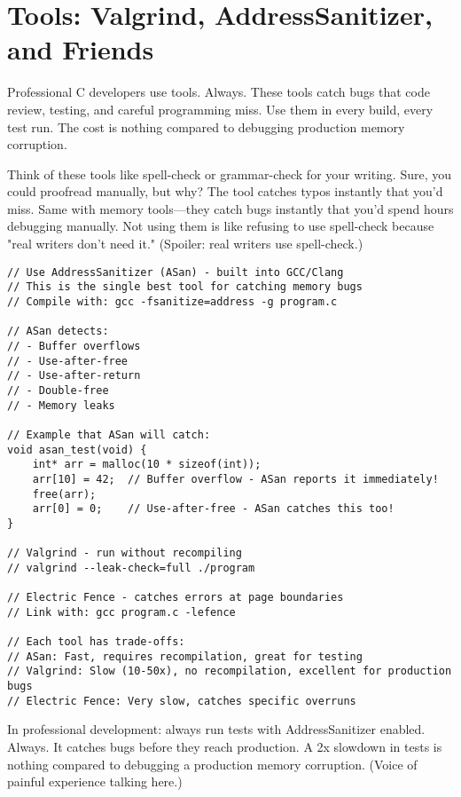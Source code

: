 \section{Tools: Valgrind, AddressSanitizer, and Friends}

Professional C developers use tools. Always. These tools catch bugs that code review, testing, and careful programming miss. Use them in every build, every test run. The cost is nothing compared to debugging production memory corruption.

Think of these tools like spell-check or grammar-check for your writing. Sure, you could proofread manually, but why? The tool catches typos instantly that you'd miss. Same with memory tools---they catch bugs instantly that you'd spend hours debugging manually. Not using them is like refusing to use spell-check because "real writers don't need it." (Spoiler: real writers use spell-check.)

\begin{lstlisting}
// Use AddressSanitizer (ASan) - built into GCC/Clang
// This is the single best tool for catching memory bugs
// Compile with: gcc -fsanitize=address -g program.c

// ASan detects:
// - Buffer overflows
// - Use-after-free
// - Use-after-return
// - Double-free
// - Memory leaks

// Example that ASan will catch:
void asan_test(void) {
    int* arr = malloc(10 * sizeof(int));
    arr[10] = 42;  // Buffer overflow - ASan reports it immediately!
    free(arr);
    arr[0] = 0;    // Use-after-free - ASan catches this too!
}

// Valgrind - run without recompiling
// valgrind --leak-check=full ./program

// Electric Fence - catches errors at page boundaries
// Link with: gcc program.c -lefence

// Each tool has trade-offs:
// ASan: Fast, requires recompilation, great for testing
// Valgrind: Slow (10-50x), no recompilation, excellent for production bugs
// Electric Fence: Very slow, catches specific overruns
\end{lstlisting}

\begin{notebox}
In professional development: always run tests with AddressSanitizer enabled. Always. It catches bugs before they reach production. A 2x slowdown in tests is nothing compared to debugging a production memory corruption. (Voice of painful experience talking here.)
\end{notebox}

